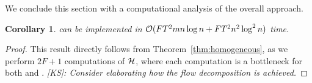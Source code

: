 \documentclass[conference]{IEEEtran}
\newcommand{\ksline}[2]{{\color{blue}#1}{\em \color{blue}[KS]: #2}}
\newcommand{\frline}[2]{{\color{blue}#1}{\em \color{blue}[FR]: #2}}
\newcommand{\ksline}[2]{#1}
\newcommand{\frline}[2]{#1}
\newtheorem{corollary}[theorem]{Corollary}
\begin{document}
We conclude this section with a computational analysis of the overall approach. 

\begin{corollary}
  \alg can be implemented in $\mathcal{O}(FT^2mn\log n+FT^2n^2\log^2n)$ time.
\end{corollary}
\begin{proof}
  This result directly follows from Theorem~\ref{thm:homogeneous}, as we perform $2F+1$ computations of $\mathcal{H}$, where each computation is a bottleneck for both \private and \shared. \ksline{}{Consider elaborating how the flow decomposition is achieved.}
\end{proof}

\end{document}

